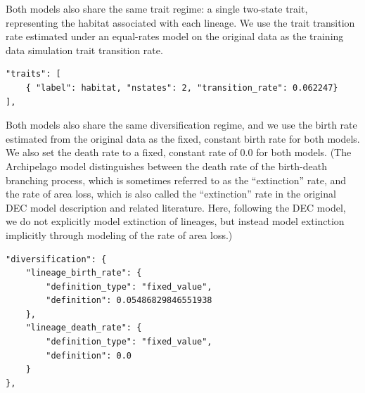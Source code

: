\documentclass[11pt,openany]{memoir} %
\begin{document}
Both models also share the same trait regime: a single two-state trait, representing the habitat associated with each lineage.
We use the trait transition rate estimated under an equal-rates model on the original data as the training data simulation trait transition rate.
\begin{lstlisting}
"traits": [
    { "label": habitat, "nstates": 2, "transition_rate": 0.062247}
],
\end{lstlisting}
Both models also share the same diversification regime, and we use the birth rate estimated from the original data as the fixed, constant birth rate for both models.
We also set the death rate to a fixed, constant rate of $0.0$ for both models.
(The Archipelago model distinguishes between the death rate of the birth-death branching process, which is sometimes referred to as the ``extinction'' rate, and the rate of area loss, which is also called the ``extinction'' rate in the original DEC model description and related literature.
Here, following the DEC model, we do not explicitly model extinction of lineages, but instead model extinction implicitly through modeling of the rate of area loss.)
\begin{lstlisting}
"diversification": {
    "lineage_birth_rate": {
        "definition_type": "fixed_value",
        "definition": 0.05486829846551938
    },
    "lineage_death_rate": {
        "definition_type": "fixed_value",
        "definition": 0.0
    }
},\end{lstlisting}
\end{document}
